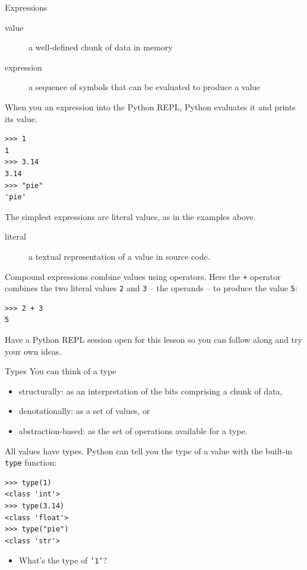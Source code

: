 \documentclass[smaller, aspectratio=1610]{beamer}
\begin{document}
\begin{frame}[label={sec:org5172f44},fragile]{Expressions}
 \begin{description}
\item[{value}] a well-defined chunk of data in memory
\item[{expression}] a sequence of symbols that can be \alert{evaluated} to produce a value
\end{description}

When you an expression into the Python REPL, Python evaluates it and prints its value.

\lstset{language=Python,label= ,caption= ,captionpos=b,numbers=none}
\begin{lstlisting}
>>> 1
1
>>> 3.14
3.14
>>> "pie"
'pie'
\end{lstlisting}

The simplest expressions are \alert{literal} values, as in the examples above.

\begin{description}
\item[{literal}] a textual representation of a value in source code.
\end{description}

Compound expressions combine values using operators.  Here the \texttt{+} operator combines the two literal values \texttt{2} and \texttt{3} -- the \alert{operands} -- to produce the value \texttt{5}:

\lstset{language=Python,label= ,caption= ,captionpos=b,numbers=none}
\begin{lstlisting}
>>> 2 + 3
5
\end{lstlisting}

Have a Python REPL session open for this lesson so you can follow along and try your own ideas.
\end{frame}

\begin{frame}[label={sec:orgb79d107},fragile]{Types}
 You can think of a type
\begin{itemize}
\item structurally: as an interpretation of the bits comprising a chunk of data,
\item denotationally: as a set of values, or
\item abstraction-based: as the set of operations available for a type.
\end{itemize}

All values have types. Python can tell you the type of a value with the built-in \texttt{type} function:

\lstset{language=Python,label= ,caption= ,captionpos=b,numbers=none}
\begin{lstlisting}
>>> type(1)
<class 'int'>
>>> type(3.14)
<class 'float'>
>>> type("pie")
<class 'str'>
\end{lstlisting}

\begin{itemize}
\item What's the type of \texttt{'1'}?
\end{itemize}
\end{frame}
\end{document}
